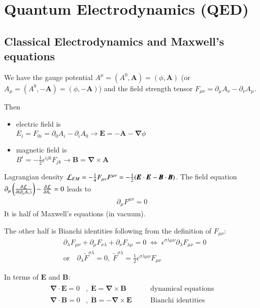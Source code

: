 \chapter{Quantum Electrodynamics (QED)}
\setcounter{chapter}{5}
\section{Classical Electrodynamics and Maxwell's equations}
We have the gauge potential $A^\mu = (A^0, \pmb{A}) = (\phi, \pmb{A})$ (or $A_\mu = (A^0, -\pmb{A}) = (\phi, -\pmb{A})$) and the field strength tensor $F_{\mu\nu} = \partial_\mu A_\nu - \partial_\nu A_\mu$.

Then
\begin{itemize}
	\item electric field is \\
      $E_i = F_{0i} = \partial_0 A_i - \partial_i A_0 \rightarrow \pmb{E} = -\dot{\pmb{A}} - \pmb{\nabla} \phi$
	\item magnetic field is \\
      $B^i = -\frac{1}{2} \epsilon^{ijk}F_{jk} \rightarrow \pmb{B} = \pmb{\nabla} \times \pmb{A}$
\end{itemize}

Lagrangian density $\mathcal{L}_{EM} = -\frac{1}{4}F_{\mu\nu}F^{\mu\nu} = -\frac{1}{2} (\pmb{E}\cdot\pmb{E} - \pmb{B}\cdot \pmb{B})$. The field equation $\partial_\mu \left( \frac{\partial \mathcal{L}}{\partial(\partial_\mu A_\nu)} \right) - \frac{\partial \mathcal{L}}{\partial A_\nu} = 0$ leads to
\begin{align}
	\partial_\mu F^{\mu\nu} = 0
\end{align}
It is half of Maxwell's equations (in vacuum).

The other half is Bianchi identities following from the definition of $F_{\mu\nu}$:
\begin{align*}
   &\partial_\lambda F_{\mu\nu} + \partial_\mu F_{\nu\lambda} + \partial_\nu F_{\lambda\mu} = 0 \; \Leftrightarrow \; \epsilon^{\sigma \lambda \mu \nu}\partial_\lambda F_{\mu\nu} = 0\\
   &\text{or} \quad  \partial_\lambda \tilde{F}^{\sigma\lambda} = 0,\; \tilde{F}^{\sigma\lambda} = \frac{1}{2} \epsilon^{\sigma\lambda\mu\nu}F_{\mu\nu}
\end{align*}

In terms of $\pmb{E}$ and $\pmb{B}$:
\begin{align*}
   \pmb{\nabla}\cdot \pmb{E} = 0&,\; \dot{\pmb{E}} = \pmb{\nabla}\times \pmb{B} \quad && \text{dynamical equations} \\
   \pmb{\nabla}\cdot \pmb{B} = 0&,\; \dot{\pmb{B}} = -\pmb{\nabla}\times \pmb{E} \quad && \text{Bianchi identities}
\end{align*}

